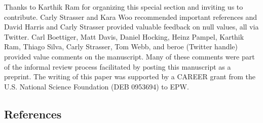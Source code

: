 Thanks to Karthik Ram for organizing this special section and inviting
us to contribute. Carly Strasser and Kara Woo recommended important
references and David Harris and Carly Strasser provided valuable
feedback on null values, all via Twitter. Carl Boettiger, Matt Davis,
Daniel Hocking, Heinz Pampel, Karthik Ram, Thiago Silva, Carly Strasser,
Tom Webb, and beroe (Twitter handle) provided value comments on the
manuscript. Many of these comments were part of the informal review
process facilitated by posting this manuscript as a preprint. The
writing of this paper was supported by a CAREER grant from the U.S.
National Science Foundation (DEB 0953694) to EPW.

\subsection{References}\label{references}
